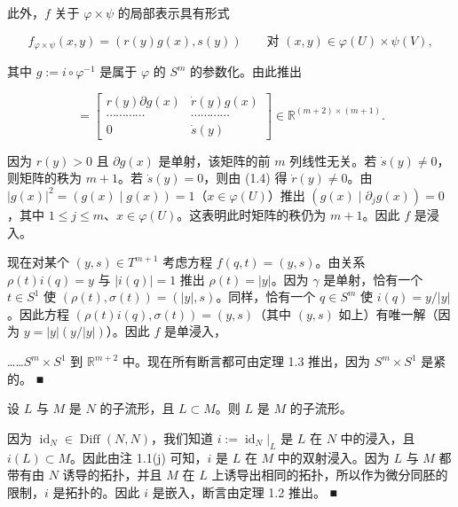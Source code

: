 \begin{example}
此外，$ f $ 关于 $ \varphi\times\psi $ 的局部表示具有形式

\[
f_{\varphi\times\psi}(x,y)=(r(y)g(x),s(y))\qquad \text{对 } (x,y)\in\varphi(U)\times\psi(V),
\]

其中 $ g:=i\circ\varphi^{-1} $ 是属于 $ \varphi $ 的 $ S^m $ 的参数化。由此推出

\begin{equation*}
[\partial f_{\varphi\times\psi}(x,y)]=\begin{bmatrix} r(y)\partial g(x) & \dot{r}(y)g(x)\\ \cdots\cdots\cdots\cdots & \cdots\cdots\cdots\cdots\\ 0 & \dot{s}(y)\end{bmatrix}\in\mathbb{R}^{(m+2)\times(m+1)}.
\end{equation*}

因为 $ r(y)>0 $ 且 $ \partial g(x) $ 是单射，该矩阵的前 $ m $ 列线性无关。若 $ \dot{s}(y)\ne0 $，则矩阵的秩为 $ m+1 $。若 $ \dot{s}(y)=0 $，则由 (1.4) 得 $ \dot{r}(y)\ne0 $。由 $ |g(x)|^2=(g(x)\mid g(x))=1 $（$ x\in\varphi(U) $）推出 $ (g(x)\mid\partial_j g(x))=0 $，其中 $ 1\le j\le m $、$ x\in\varphi(U) $。这表明此时矩阵的秩仍为 $ m+1 $。因此 $ f $ 是浸入。

现在对某个 $ (y,s)\in T^{m+1} $ 考虑方程 $ f(q,t)=(y,s) $。由关系 $ \rho(t)i(q)=y $ 与 $ |i(q)|=1 $ 推出 $ \rho(t)=|y| $。因为 $ \gamma $ 是单射，恰有一个 $ t\in S^1 $ 使 $ (\rho(t),\sigma(t))=(|y|,s) $。同样，恰有一个 $ q\in S^m $ 使 $ i(q)=y/|y| $。因此方程 $ (\rho(t)i(q),\sigma(t))=(y,s) $（其中 $ (y,s) $ 如上）有唯一解（因为 $ y=|y|(y/|y|) $）。因此 $ f $ 是单浸入，

……$ S^m \times S^1 $ 到 $ \mathbb{R}^{m+2} $ 中。现在所有断言都可由定理 1.3 推出，因为 $ S^m \times S^1 $ 是紧的。 \nobreak\hspace{0.35em}■

\begin{items}
\item[（c）]

设 $ L $ 与 $ M $ 是 $ N $ 的子流形，且 $ L \subset M $。则 $ L $ 是 $ M $ 的子流形。

\proofhead
因为 $ \operatorname{id}_N \in \operatorname{Diff}(N, N) $，我们知道 $ i := \operatorname{id}_N|_L $ 是 $ L $ 在 $ N $ 中的浸入，且 $ i(L) \subset M $。因此由注 1.1(j) 可知，$ i $ 是 $ L $ 在 $ M $ 中的双射浸入。因为 $ L $ 与 $ M $ 都带有由 $ N $ 诱导的拓扑，并且 $ M $ 在 $ L $ 上诱导出相同的拓扑，所以作为微分同胚的限制，$ i $ 是拓扑的。因此 $ i $ 是嵌入，断言由定理 1.2 推出。 \nobreak\hspace{0.35em}■
\item[（d）]


\end{items}
\end{example}
